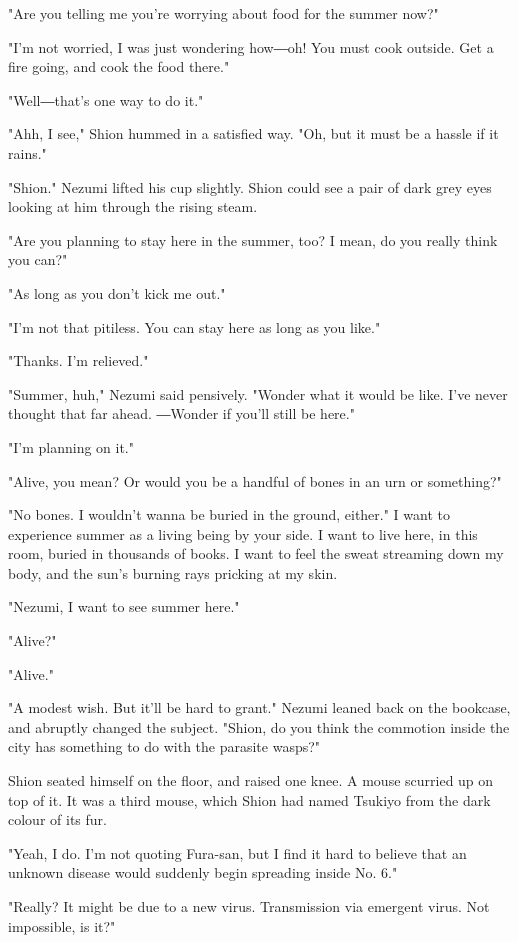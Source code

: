 "Are you telling me you're worrying about food for the summer now?"

"I'm not worried, I was just wondering how―oh! You must cook outside.
Get a fire going, and cook the food there."

"Well―that's one way to do it."

"Ahh, I see," Shion hummed in a satisfied way. "Oh, but it must be a
hassle if it rains."

"Shion." Nezumi lifted his cup slightly. Shion could see a pair of dark
grey eyes looking at him through the rising steam.

"Are you planning to stay here in the summer, too? I mean, do you really
think you can?"

"As long as you don't kick me out."

"I'm not that pitiless. You can stay here as long as you like."

"Thanks. I'm relieved."

"Summer, huh," Nezumi said pensively. "Wonder what it would be like.
I've never thought that far ahead. ―Wonder if you'll still be here."

"I'm planning on it."

"Alive, you mean? Or would you be a handful of bones in an urn or
something?"

"No bones. I wouldn't wanna be buried in the ground, either." I want to
experience summer as a living being by your side. I want to live here,
in this room, buried in thousands of books. I want to feel the sweat
streaming down my body, and the sun's burning rays pricking at my skin.

"Nezumi, I want to see summer here."

"Alive?"

"Alive."

"A modest wish. But it'll be hard to grant." Nezumi leaned back on the
bookcase, and abruptly changed the subject. "Shion, do you think the
commotion inside the city has something to do with the parasite wasps?"

Shion seated himself on the floor, and raised one knee. A mouse scurried
up on top of it. It was a third mouse, which Shion had named Tsukiyo
from the dark colour of its fur.

"Yeah, I do. I'm not quoting Fura-san, but I find it hard to believe
that an unknown disease would suddenly begin spreading inside No. 6."

"Really? It might be due to a new virus. Transmission via emergent
virus. Not impossible, is it?"

